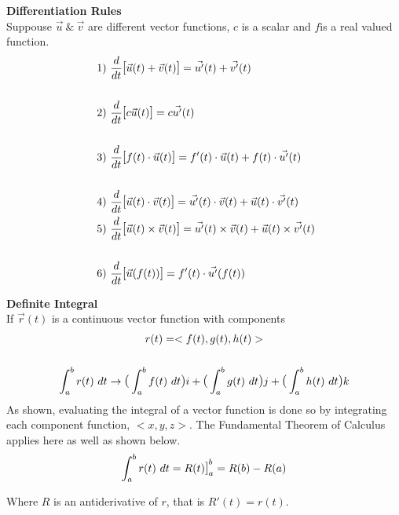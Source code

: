 \documentclass{article}
\begin{document}
  \textbf{Differentiation Rules}\\
  Suppouse $ \vec{u} ~\&~ \vec{v} $ are different vector functions, $ c $ is a scalar and $ f $is a real valued function.
  \[
      \begin{aligned}
      &1)~\frac{d}{dt} \text{\large{[}} \vec{u}(t)+\vec{v}(t) \text{\large{]}}=\vec{u'}(t)+\vec{v'}(t)\\
      ~\\
      &2)~\frac{d}{dt} \text{\large{[}} c\vec{u}(t) \text{\large{]}}=c\vec{u'}(t)\\
      ~\\
      &3)~\frac{d}{dt} \text{\large{[}} f(t) \cdot \vec{u}(t) \text{\large{]}}=f'(t)\cdot \vec{u}(t)+f(t)\cdot \vec{u'}(t)\\
      ~\\
      &4)~\frac{d}{dt} \text{\large{[}} \vec{u}(t) \cdot \vec{v}(t) \text{\large{]}}=\vec{u'}(t) \cdot \vec{v}(t)+\vec{u}(t)\cdot \vec{v'}(t)
      ~\\
      &5)~\frac{d}{dt} \text{\large{[}} \vec{u}(t) \times \vec{v}(t) \text{\large{]}}=\vec{u'}(t) \times \vec{v}(t) + \vec{u}(t) \times \vec{v'}(t)\\
      ~\\
      &6)~\frac{d}{dt} \text{\large{[}} \vec{u}(f(t)) \text{\large{]}}=f'(t) \cdot \vec{u'}(f(t))
      \end{aligned}
  \]

  \textbf{Definite Integral}\\
  If $ \vec{r}(t) $ is a continuous vector function with components
  \[
      \begin{gathered}
      r(t)=< f(t), g(t), h(t) >\\
      ~\\
      \int^{b}_{a} r(t)~dt \to \text{\large{(}} \int^{b}_{a} f(t)~dt \text{\large{)}}i + \text{\large{(}} \int^{b}_{a} g(t)~dt \text{\large{)}}j + \text{\large{(}} \int^{b}_{a} h(t)~dt \text{\large{)}}k\\
      \end{gathered}
  \]
  As shown, evaluating the integral of a vector function is done so by integrating each component function, $ < x, y, z >  $. The Fundamental Theorem of Calculus applies here as well as shown below.
  \[
      \int^{b}_{a} r(t)~dt=R(t) \text{\large{]}}^{b}_{a}=R(b) -R(a)
  \]

  Where $ R $ is an antiderivative of $ r $, that is $ R'(t) = r(t)$.
\end{document}
